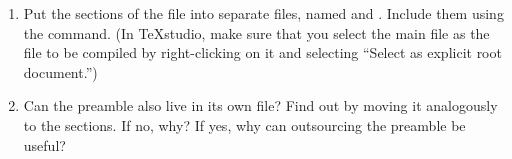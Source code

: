\begin{enumerate}
  \item Put the sections of the file into separate files, named  and . 
  Include them using the  command. (In TeXstudio, make sure that you select the main file as the file to be compiled by right-clicking on it and selecting \enquote{Select as explicit root document.})
  \item Can the preamble also live in its own file? Find out by moving it analogously to the sections. If no, why? If yes, why can outsourcing the preamble be useful?
\end{enumerate}
